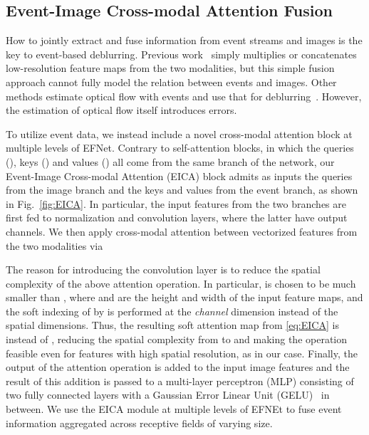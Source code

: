 \documentclass[runningheads]{llncs}
\newlength \g
\begin{document}
\subsection{Event-Image Cross-modal Attention Fusion}
\label{sec:method:eica}

How to jointly extract and fuse information from event streams and images is the key to event-based deblurring. Previous work~\cite{jiang2020learning_event_motion_deblur,lin2020learning_event_video_deblur} simply multiplies or concatenates low-resolution feature maps from the two modalities, but this simple fusion approach cannot fully model the relation between events and images. Other methods estimate optical flow with events and use that for deblurring~\cite{shang2021bringing}. However, the estimation of optical flow itself introduces errors.

To utilize event data, we instead include a novel cross-modal attention block at multiple levels of EFNet. Contrary to self-attention blocks, in which the queries (), keys () and values () all come from the same branch of the network, our Event-Image Cross-modal Attention (EICA) block admits as inputs the queries  from the image branch and the keys  and values  from the event branch, as shown in Fig.~\ref{fig:EICA}. In particular, the input features from the two branches are first fed to normalization and  convolution layers, where the latter have  output channels. We then apply cross-modal attention between vectorized features from the two modalities via



The reason for introducing the  convolution layer is to reduce the spatial complexity of the above attention operation. In particular,  is chosen to be much smaller than , where  and  are the height and width of the input feature maps, and the soft indexing of  by  is performed at the \emph{channel} dimension instead of the spatial dimensions. Thus, the resulting soft attention map from \eqref{eq:EICA} is  instead of , reducing the spatial complexity from  to  and making the operation feasible even for features with high spatial resolution, as in our case.
Finally, the output of the attention operation is added to the input image features and the result of this addition is passed to a  multi-layer perceptron (MLP) consisting of two fully connected layers with a Gaussian Error Linear Unit (GELU)~\cite{hendrycks2016gaussian} in between. We use the EICA module at multiple levels of EFNEt to fuse event information aggregated across receptive fields of varying size.
\end{document}
